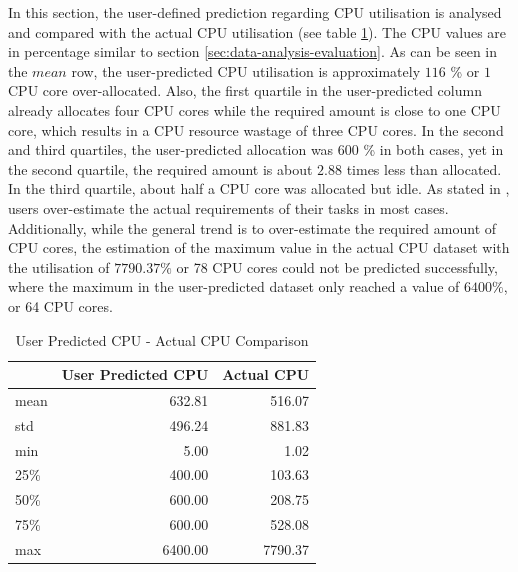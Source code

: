         In this section, the user-defined prediction regarding CPU utilisation is analysed and compared with the actual CPU utilisation (see table \ref{tab:user-predicted-cpu-comparison}).
        The CPU values are in percentage similar to section \ref{sec:data-analysis-evaluation}.
        As can be seen in the $mean$ row, the user-predicted CPU utilisation is approximately $116$ \% or $1$ CPU core over-allocated. 
        Also, the first quartile in the user-predicted column already allocates four CPU cores while the required amount is close to one CPU core, which results in a CPU resource wastage of three CPU cores.
        In the second and third quartiles, the user-predicted allocation was 600 \% in both cases, yet in the second quartile, the required amount is about $2.88$ times less than allocated.
        In the third quartile, about half a CPU core was allocated but idle.
        As stated in \cite{thonglekImprovingResourceUtilization2019}, users over-estimate the actual requirements of their tasks in most cases.
        Additionally, while the general trend is to over-estimate the required amount of CPU cores, the estimation of the maximum value in the actual CPU dataset with the utilisation of $7790.37 \%$ or 78 CPU cores could not be predicted successfully, where the maximum in the user-predicted dataset only reached a value of $6400\%$, or 64 CPU cores.
        \begin{table}
          \centering
          \caption{User Predicted CPU - Actual CPU Comparison}
          \label{tab:user-predicted-cpu-comparison}

          \begin{tabular}{|l|rr|}
            \toprule
            {} &  User Predicted CPU &  Actual CPU \\
            \midrule
            mean       &         632.81 &     516.07 \\
            std        &         496.24 &     881.83 \\
            min        &           5.00 &       1.02 \\
            25\%        &         400.00 &     103.63 \\
            50\%        &         600.00 &     208.75 \\
            75\%        &         600.00 &     528.08 \\
            max        &        6400.00 &    7790.37 \\
            \bottomrule
            \end{tabular}
        \end{table}
